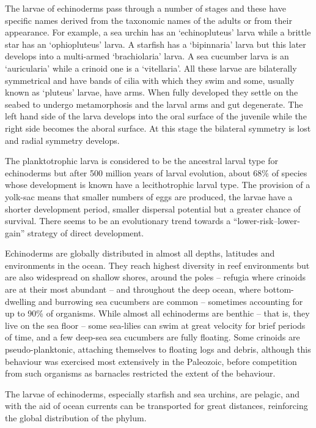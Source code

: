 The larvae of echinoderms pass through a number of stages and these have specific names derived from the taxonomic names of the adults or from their appearance. For example, a sea urchin has an `echinopluteus' larva while a brittle star has an `ophiopluteus' larva. A starfish has a `bipinnaria' larva but this later develops into a multi-armed `brachiolaria' larva. A sea cucumber larva is an `auricularia' while a crinoid one is a `vitellaria'. All these larvae are bilaterally symmetrical and have bands of cilia with which they swim and some, usually known as `pluteus' larvae, have arms. When fully developed they settle on the seabed to undergo metamorphosis and the larval arms and gut degenerate. The left hand side of the larva develops into the oral surface of the juvenile while the right side becomes the aboral surface. At this stage the bilateral symmetry is lost and radial symmetry develops.

The planktotrophic larva is considered to be the ancestral larval type for echinoderms but after 500 million years of larval evolution, about 68\% of species whose development is known have a lecithotrophic larval type. The provision of a yolk-sac means that smaller numbers of eggs are produced, the larvae have a shorter development period, smaller dispersal potential but a greater chance of survival. There seems to be an evolutionary trend towards a ``lower-risk--lower-gain'' strategy of direct development.

Echinoderms are globally distributed in almost all depths, latitudes and environments in the ocean. They reach highest diversity in reef environments but are also widespread on shallow shores, around the poles -- refugia where crinoids are at their most abundant -- and throughout the deep ocean, where bottom-dwelling and burrowing sea cucumbers are common -- sometimes accounting for up to 90\% of organisms. While almost all echinoderms are benthic -- that is, they live on the sea floor -- some sea-lilies can swim at great velocity for brief periods of time, and a few deep-sea sea cucumbers are fully floating. Some crinoids are pseudo-planktonic, attaching themselves to floating logs and debris, although this behaviour was exercised most extensively in the Paleozoic, before competition from such organisms as barnacles restricted the extent of the behaviour.

The larvae of echinoderms, especially starfish and sea urchins, are pelagic, and with the aid of ocean currents can be transported for great distances, reinforcing the global distribution of the phylum.

